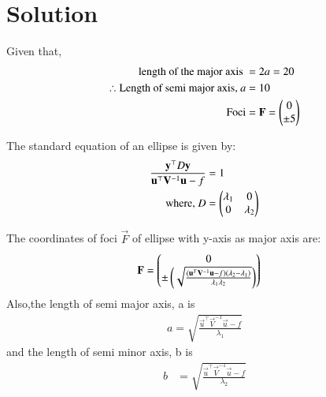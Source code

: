 \documentclass[journal,12pt,twocolumn]{IEEEtran}
\begin{document}
\section{Solution}
Given that,
\begin{align}
\text{length of the major axis }&= 2a = 20 
\\
\therefore \text{Length of semi major axis, } a&=10\label{eqA}
  \\
\text{Foci}&=\mathbf{F} = \begin{pmatrix}0\\\pm5\end{pmatrix} \label{eqB}
\end{align}
\begin{lemma}
\label{lemma}
The standard equation of an ellipse is given by:
\begin{align}
\frac{\mathbf{y}^{\top}D\mathbf{y}}{\mathbf{u}^{\top}\mathbf{V}^{-1}\mathbf{u}-f}&=1
\\
\text{where, } D &=\begin{pmatrix}\lambda_1& 0 \\ 0 & \lambda_2\end{pmatrix}
\end{align}
\end{lemma}
\begin{lemma}
The coordinates of foci $\vec{F}$ of ellipse  with y-axis as major axis are:
 \begin{align}
  \mathbf{F} &= \begin{pmatrix}0\\\pm \left(\sqrt{\frac{(\mathbf{u}^T\mathbf{V}^{-1}\mathbf{u}-f)(\lambda_2-\lambda_1)}{\lambda_1\lambda_2}}\right)\end{pmatrix} \label{eqC}
\end{align}
Also,the length of semi major axis, a is
\begin{align}
  a = \sqrt{\frac{\vec{u}^{\top}\vec{V}^{-1}\vec{u}-f}{\lambda_1}} \label{eqD}
  \end{align}
and the length of semi minor axis, b is
  \begin{align}
  b &= \sqrt{\frac{\vec{u}^{\top}\vec{V}^{-1}\vec{u}-f}{\lambda_2}} 
 \end{align}
\end{lemma}
\end{document}
